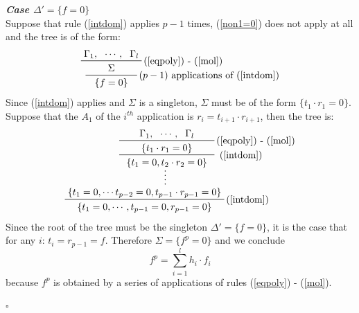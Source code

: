 \documentclass[a4paper,12pt,oneside]{book}
\newcommand*{\QED}{\hfill\ensuremath{\square}}
\begin{document}
\textbf{\emph{Case $\Delta '=\{f=0\}$ }} \\
Suppose that rule (\ref{intdom}) applies $p-1$ times, (\ref{non1=0}) does not apply at all and the tree is of the form:
$$
\prftree[r]{$(p-1)$ applications of (\ref{intdom})}
{ \prftree[r]{(\ref{eqpoly}) - (\ref{mol})}
{ \Gamma_1, }{\cdots ,}{\Gamma_l}
{\hspace{7mm}\Sigma\hspace{7mm}	} 
}
{\{f=0\} }
$$
Since (\ref{intdom}) applies and $\Sigma$ is a singleton, $\Sigma$ must be of the form $ \{ t_1 \cdot r_1 =0 \}$. Suppose that the $A_1$ of the $i^{th}$ application is $r_i=t_{i+1}\cdot r_{i+1}$, then the tree is:
$$
\prfsummary{
\prftree[r]{ (\ref{intdom})}
{ \prftree[r]{(\ref{eqpoly}) - (\ref{mol})}
{ \Gamma_1, }{\cdots ,}{\Gamma_l}
{\hspace{7mm}\{t_1 \cdot r_1=0\}\hspace{7mm}	} 
}
{\{ t_1=0, t_2 \cdot r_2=0\} }
}
{\prftree[r]{(\ref{intdom})}
{\{ t_1=0,\cdots t_{p-2}=0, t_{p-1}\cdot r_{p-1}=0\}  }
{\{ t_1=0,\cdots ,t_{p-1}=0,r_{p-1}=0\}}
}
$$
Since the root of the tree must be the singleton $\Delta '=\{f=0\}$, it is the case that for any $i$: $t_i=r_{p-1}=f $.
Therefore $\Sigma= \{ f^p =0 \}$ and we conclude 
$$f^p = \sum_{i=1}^l h_i \cdot f_i $$
because  $f^p$ is obtained by a series of applications of rules (\ref{eqpoly}) - (\ref{mol}).

\QED
\end{document}
